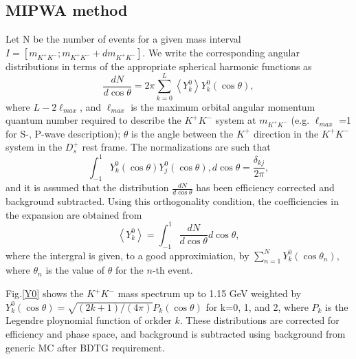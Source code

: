 \subsection{MIPWA method}
\par{Let N be the number of events for a given mass interval $I=[m_{K^{+}K^{-}}; m_{K^{+}K^{-}} + dm_{K^{+}K^{-}}]$. We write the corresponding angular distributions in terms of the appropriate spherical harmonic functions as
    \begin{equation}
        \frac{dN}{d\cos\theta} = 2\pi\sum_{k=0}^L\left\langle Y_{k}^{0}\right\rangle Y_{k}^{0}(\cos\theta),\label{expansion}
    \end{equation}
    where $L - 2 \ell_{max}$, and $\ell_{max}$ is the maximum orbital angular momentum quantum number required to describe the $K^{+}K^{-}$ system at $m_{K^{+}K^{-}}$ (e.g. $\ell_{max}$ =1 for S-, P-wave description); $\theta$ is the angle between the $K^{+}$ direction in the $K^{+}K^{-}$ system in the $D_{s}^{+}$ rest frame. The normalizations are such that
    \begin{equation}
        \int_{-1}^{1}Y_{k}^{0}(\cos\theta)Y_{j}^{0}(\cos\theta), d\cos\theta  = \frac{\delta_{kj}}{2\pi},\label{sh-normalizations}
    \end{equation}
    and it is  assumed that the distribution $\frac{dN}{d\cos\theta}$ has been efficiency corrected and background subtracted.
    Using this orthogonality condition, the coefficiencies in the expansion are obtained from 
    \begin{equation}
        \left\langle Y_{k}^{0} \right\rangle = \int_{-1}^{1} \frac{dN}{d\cos\theta} d\cos\theta,\label{expansion-coefficiencies}
    \end{equation}
    where the intergral is given, to a good approximiation, by $\sum_{n=1}^{N}Y_{k}^{0}(\cos\theta_{n})$, where $\theta_{n}$ is the value of $\theta$ for the $n$-th event.
    
    Fig.\ref{Y0} shows the $K^{+}K^{-}$ mass spectrum up to 1.15 GeV weighted by $Y_{k}^{0}(\cos\theta) = \sqrt{(2k+1)/(4\pi)}P_{k}(\cos\theta)$ for k=0, 1, and 2, where $P_{k}$ is the Legendre ploynomial function of orkder $k$. These distributions are corrected for efficiency and phase space, and background is subtracted using background from generic MC after BDTG requirement.
    
}
